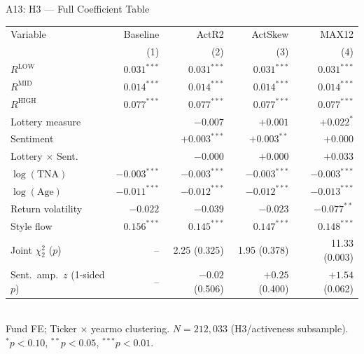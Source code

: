 \documentclass[10pt, aspectratio=169]{beamer}
\begin{document}
\begin{frame}{A13: H3 — Full Coefficient Table}
  \scriptsize
  \setlength{\tabcolsep}{5pt}
  \begin{tabular}{@{}lrrrr@{}}
    \toprule
    Variable & Baseline & ActR2 & ActSkew & MAX12 \\
    & (1) & (2) & (3) & (4) \\
    \midrule
    $R^{\text{LOW}}$              & $0.031^{***}$ & $0.031^{***}$ & $0.031^{***}$ & $0.031^{***}$ \\
    $R^{\text{MID}}$              & $0.014^{***}$ & $0.014^{***}$ & $0.014^{***}$ & $0.014^{***}$ \\
    $R^{\text{HIGH}}$             & $0.077^{***}$ & $0.077^{***}$ & $0.077^{***}$ & $0.077^{***}$ \\
    Lottery measure               &               & $-0.007$      & $+0.001$      & $+0.022^{*}$ \\
    Sentiment                     &               & $+0.003^{***}$& $+0.003^{**}$ & $+0.000$ \\
    Lottery $\times$ Sent.        &               & $-0.000$      & $+0.000$      & $+0.033$ \\
    $\log(\text{TNA})$            & $-0.003^{***}$& $-0.003^{***}$& $-0.003^{***}$& $-0.003^{***}$ \\
    $\log(\text{Age})$            & $-0.011^{***}$& $-0.012^{***}$& $-0.012^{***}$& $-0.013^{***}$ \\
    Return volatility             & $-0.022$      & $-0.039$      & $-0.023$      & $-0.077^{**}$ \\
    Style flow                    & $0.156^{***}$ & $0.145^{***}$ & $0.147^{***}$ & $0.148^{***}$ \\
    \midrule
    Joint $\chi^2_2$ ($p$)        & --            & 2.25 (0.325)  & 1.95 (0.378)  & 11.33 (0.003) \\
    Sent.\ amp.\ $z$ (1-sided $p$)& --            & $-0.02$ (0.506) & $+0.25$ (0.400) & $+1.54$ (0.062) \\
    \bottomrule
  \end{tabular}
  \vspace{3pt}\\
  \tiny Fund FE; Ticker $\times$ yearmo clustering. $N=212{,}033$ (H3/activeness subsample).
  $^{*}p<0.10$, $^{**}p<0.05$, $^{***}p<0.01$.
\end{frame}

\end{document}
